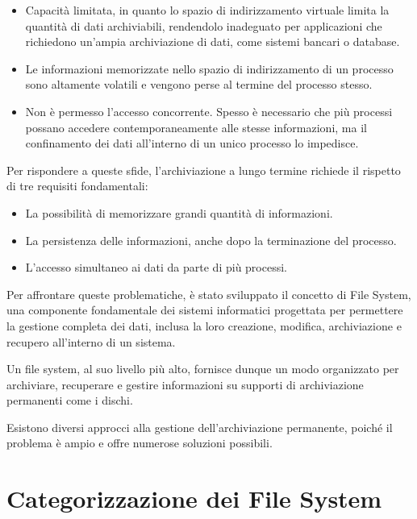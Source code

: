 \documentclass[12pt,a4paper,openright,twoside]{book}
\begin{document}
        \begin{itemize}
            \item Capacità limitata, in quanto lo spazio di indirizzamento virtuale limita la quantità di dati archiviabili, rendendolo inadeguato per applicazioni che richiedono un'ampia archiviazione di dati, come sistemi bancari o database.
            \item Le informazioni memorizzate nello spazio di indirizzamento di un processo sono altamente volatili e vengono perse al termine del processo stesso.
            \item Non è permesso l'accesso concorrente. Spesso è necessario che più processi possano accedere contemporaneamente alle stesse informazioni, ma il confinamento dei dati all'interno di un unico processo lo impedisce.
        \end{itemize}

        Per rispondere a queste sfide, l'archiviazione a lungo termine richiede il rispetto di tre requisiti fondamentali:

        \begin{itemize}
            \item La possibilità di memorizzare grandi quantità di informazioni.
            \item La persistenza delle informazioni, anche dopo la terminazione del processo.
            \item L'accesso simultaneo ai dati da parte di più processi.
        \end{itemize}

        Per affrontare queste problematiche, è stato sviluppato il concetto di File System, una componente fondamentale dei sistemi informatici progettata per permettere la gestione completa dei dati, inclusa la loro creazione, modifica, archiviazione e recupero all'interno di un sistema.

        Un file system, al suo livello più alto, fornisce dunque un modo organizzato per archiviare, recuperare e gestire informazioni su supporti di archiviazione permanenti come i dischi.

        Esistono diversi approcci alla gestione dell'archiviazione permanente, poiché il problema è ampio e offre numerose soluzioni possibili.
        \cite{giampaolo1998practical}\cite{tanenbaum2015modern}

    \section{Categorizzazione dei File System}
\end{document}
